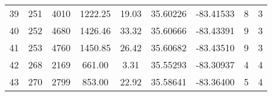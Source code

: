 \begin{table}[p]
\begin{tabular}{ccccccccc}
39 & 251                                                 & 4010                                                          & 1222.25                                                     & 19.03 & 35.60226 & -83.41533 & 8                                                                                      & 3 \\ 
40 & 252                                                 & 4680                                                          & 1426.46                                                     & 33.32 & 35.60666 & -83.43391 & 9                                                                                      & 3 \\ 
41 & 253                                                 & 4760                                                          & 1450.85                                                     & 26.42 & 35.60682 & -83.43510 & 9                                                                                      & 3 \\ 
42 & 268                                                 & 2169                                                          & 661.00                                                       & 3.31   & 35.55293 & -83.30937 & 4                                                                                      & 4 \\ 
43 & 270                                                 & 2799                                                          & 853.00                                                       & 22.92 & 35.58641 & -83.36400 & 5                                                                                      & 4 \\  
\bottomrule
\end{tabular}
\label{tab:Site Data}
\end{table}